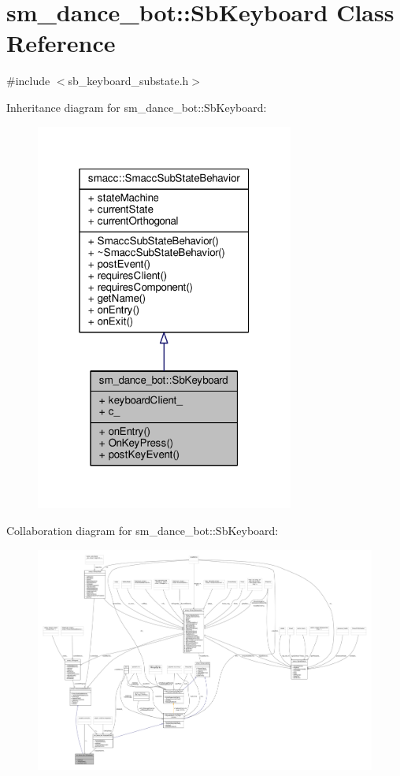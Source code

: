 \hypertarget{classsm__dance__bot_1_1SbKeyboard}{}\section{sm\+\_\+dance\+\_\+bot\+:\+:Sb\+Keyboard Class Reference}
\label{classsm__dance__bot_1_1SbKeyboard}


{\ttfamily \#include $<$sb\+\_\+keyboard\+\_\+substate.\+h$>$}



Inheritance diagram for sm\+\_\+dance\+\_\+bot\+:\+:Sb\+Keyboard\+:
\nopagebreak
\begin{figure}[H]
\begin{center}
\leavevmode
\includegraphics[width=241pt]{classsm__dance__bot_1_1SbKeyboard__inherit__graph}
\end{center}
\end{figure}


Collaboration diagram for sm\+\_\+dance\+\_\+bot\+:\+:Sb\+Keyboard\+:
\nopagebreak
\begin{figure}[H]
\begin{center}
\leavevmode
\includegraphics[width=350pt]{classsm__dance__bot_1_1SbKeyboard__coll__graph}
\end{center}
\end{figure}
